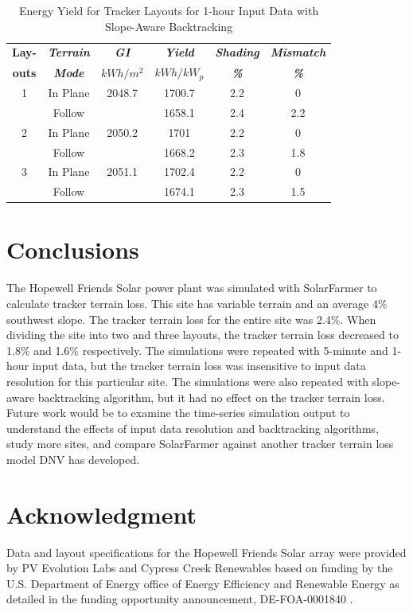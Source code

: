\documentclass[conference]{IEEEtran}
\begin{document}
\begin{table}[htbp]
\caption{Energy Yield for Tracker Layouts for 1-hour Input Data with Slope-Aware Backtracking}
\begin{center}
\begin{tabular}{|c|c|c|c|c|c|}
\hline
\textbf{Lay-}& \textbf{\textit{Terrain}}& \textbf{\textit{GI}}&        \textbf{\textit{Yield}}&        \textbf{\textit{Shading}}& \textbf{\textit{Mismatch}} \\
\textbf{outs}& \textbf{\textit{Mode}}&    \textbf{\textit{$kWh/m^2$}}& \textbf{\textit{$kWh / kW_p$}}& \textbf{\textit{\%}}&      \textbf{\textit{\%}} \\
\hline
1& In Plane& 2048.7&  1700.7& 2.2& 0 \\
 & Follow&         &  1658.1& 2.4& 2.2 \\
\hline
2& In Plane& 2050.2&  1701&   2.2& 0 \\
 & Follow&         &  1668.2& 2.3& 1.8 \\
\hline
3& In Plane& 2051.1&  1702.4& 2.2& 0 \\
 & Follow&         &  1674.1& 2.3& 1.5 \\
\hline
\end{tabular}
\label{table:slope-1hr}
\end{center}
\end{table}

\section{Conclusions}
The Hopewell Friends Solar power plant was simulated with SolarFarmer to calculate tracker terrain loss. This site has variable terrain and an average 4\% southwest slope. The tracker terrain loss for the entire site was 2.4\%. When dividing the site into two and three layouts, the tracker terrain loss decreased to 1.8\% and 1.6\% respectively. The simulations were repeated with 5-minute and 1-hour input data, but the tracker terrain loss was insensitive to input data resolution for this particular site. The simulations were also repeated with slope-aware backtracking algorithm, but it had no effect on the tracker terrain loss. Future work would be to examine the time-series simulation output to understand the effects of input data resolution and backtracking algorithms, study more sites, and compare SolarFarmer against another tracker terrain loss model DNV has developed.

\section*{Acknowledgment}

Data and layout specifications for the Hopewell Friends Solar array were provided by PV Evolution Labs and Cypress Creek Renewables based on funding by the U.S. Department of Energy office of Energy Efficiency and Renewable Energy as detailed in the funding opportunity announcement, DE-FOA-0001840 \cite{CypressCreekRenewables2019}.



\end{document}
